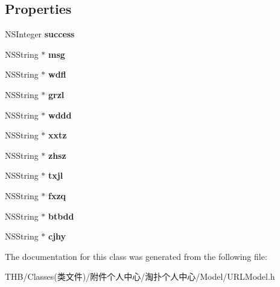 \subsection*{Properties}
\begin{DoxyCompactItemize}
\item 
\mbox{\label{interface_u_r_l_model_ab9ca970b2806d89d6c233d122bae20f6}} 
N\+S\+Integer {\bfseries success}
\item 
\mbox{\label{interface_u_r_l_model_a192ce04372415b509eb46d32f818d4f4}} 
N\+S\+String $\ast$ {\bfseries msg}
\item 
\mbox{\label{interface_u_r_l_model_ab180054688f627fd15ad3fa0b25072ac}} 
N\+S\+String $\ast$ {\bfseries wdfl}
\item 
\mbox{\label{interface_u_r_l_model_aa53771605908942455126795069449f1}} 
N\+S\+String $\ast$ {\bfseries grzl}
\item 
\mbox{\label{interface_u_r_l_model_a2b5d0b3dbba18c9cb89ff5b4c696b7cd}} 
N\+S\+String $\ast$ {\bfseries wddd}
\item 
\mbox{\label{interface_u_r_l_model_a1c569d1a0c4e63bcb5c791b6a18a00c9}} 
N\+S\+String $\ast$ {\bfseries xxtz}
\item 
\mbox{\label{interface_u_r_l_model_a2325645f3dc4acf701fbce8c21de6d37}} 
N\+S\+String $\ast$ {\bfseries zhsz}
\item 
\mbox{\label{interface_u_r_l_model_a51f5e83ac5577a2817e5a6c85d0a8172}} 
N\+S\+String $\ast$ {\bfseries txjl}
\item 
\mbox{\label{interface_u_r_l_model_a57014c801786c408df4d00a39986989c}} 
N\+S\+String $\ast$ {\bfseries fxzq}
\item 
\mbox{\label{interface_u_r_l_model_a92cc1e7289e3ff731568a0154e462013}} 
N\+S\+String $\ast$ {\bfseries btbdd}
\item 
\mbox{\label{interface_u_r_l_model_a60b1e6a52146b149490cbbcd5ce1a2c2}} 
N\+S\+String $\ast$ {\bfseries cjhy}
\end{DoxyCompactItemize}


The documentation for this class was generated from the following file\+:\begin{DoxyCompactItemize}
\item 
T\+H\+B/\+Classes(类文件)/附件个人中心/淘扑个人中心/\+Model/U\+R\+L\+Model.\+h\end{DoxyCompactItemize}
